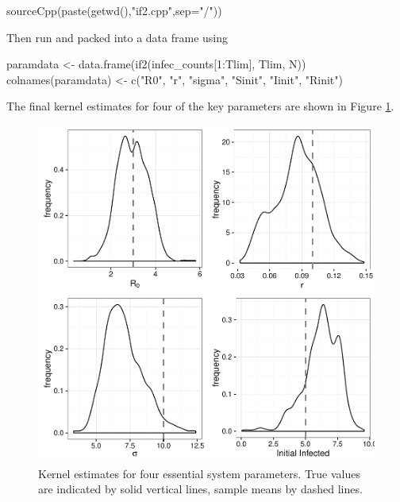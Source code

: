     \begin{R}
    sourceCpp(paste(getwd(),"if2.cpp",sep="/"))
    \end{R}

    Then run and packed into a data frame using

    \begin{R}
    paramdata <- data.frame(if2(infec_counts[1:Tlim], Tlim, N))
	  colnames(paramdata) <- c("R0", "r", "sigma", "Sinit", "Iinit", "Rinit")
    \end{R}

    The final kernel estimates for four of the key parameters are shown in Figure \ref{kernelplot}.

    \begin{figure}[H]
        \centering
        \includegraphics[width=\textwidth]{./images/if2kernels.pdf}
        \caption{Kernel estimates for four essential system parameters. True values are indicated by solid vertical lines, sample means by dashed lines.}
        \label{kernelplot}
    \end{figure}

